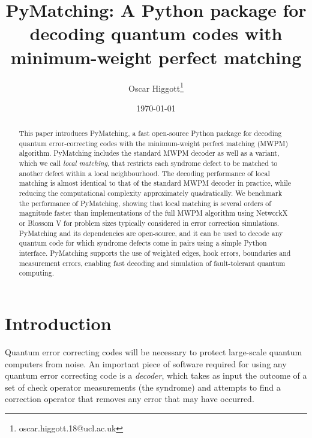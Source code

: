 \documentclass{article}
\begin{document}
	\title{PyMatching: A Python package for decoding quantum codes with minimum-weight perfect matching}

	\author[1]{Oscar Higgott\thanks{oscar.higgott.18@ucl.ac.uk}}
	\date{\today}
	
	\maketitle
	
	\begin{abstract}
	This paper introduces PyMatching, a fast open-source Python package for decoding quantum error-correcting codes with the minimum-weight perfect matching (MWPM) algorithm.
	PyMatching includes the standard MWPM decoder as well as a variant, which we call \textit{local matching}, that restricts each syndrome defect to be matched to another defect within a local neighbourhood. 
	The decoding performance of local matching is almost identical to that of the standard MWPM decoder in practice, while reducing the computational complexity approximately quadratically.
	We benchmark the performance of PyMatching, showing that local matching is several orders of magnitude faster than implementations of the full MWPM algorithm using NetworkX or Blossom V for problem sizes typically considered in error correction simulations.
	PyMatching and its dependencies are open-source, and it can be used to decode any quantum code for which syndrome defects come in pairs using a simple Python interface.
	PyMatching supports the use of weighted edges, hook errors, boundaries and measurement errors, enabling fast decoding and simulation of fault-tolerant quantum computing.
	\end{abstract}

\section{Introduction}


Quantum error correcting codes will be necessary to protect large-scale quantum computers from noise.
An important piece of software required for using any quantum error correcting code is a \textit{decoder}, which takes as input the outcome of a set of check operator measurements (the syndrome) and attempts to find a correction operator that removes any error that may have occurred.
\end{document}
